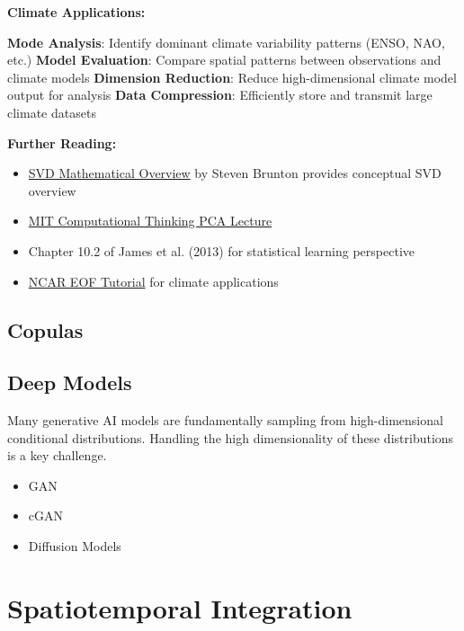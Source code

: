 \documentclass[
  letterpaper,
  DIV=11,
  numbers=noendperiod]{scrreprt}
\providecommand{\tightlist}{%
  \setlength{\itemsep}{0pt}\setlength{\parskip}{0pt}}
\begin{document}
\textbf{Climate Applications:}

\textbf{Mode Analysis}: Identify dominant climate variability patterns
(ENSO, NAO, etc.) \textbf{Model Evaluation}: Compare spatial patterns
between observations and climate models \textbf{Dimension Reduction}:
Reduce high-dimensional climate model output for analysis \textbf{Data
Compression}: Efficiently store and transmit large climate datasets

\textbf{Further Reading:}

\begin{itemize}
\tightlist
\item
  \href{https://youtube.com/watch?v=nbBvuuNVfco&feature=shared}{SVD
  Mathematical Overview} by Steven Brunton provides conceptual SVD
  overview
\item
  \href{https://computationalthinking.mit.edu/Fall23/data_science/pca/}{MIT
  Computational Thinking PCA Lecture}
\item
  Chapter 10.2 of James et al. (2013) for statistical learning
  perspective
\item
  \href{https://climatedataguide.ucar.edu/climate-tools/empirical-orthogonal-function-eof-analysis-and-rotated-eof-analysis}{NCAR
  EOF Tutorial} for climate applications
\end{itemize}

\subsection{Copulas}\label{copulas}

\subsection{Deep Models}\label{deep-models}

Many generative AI models are fundamentally sampling from
high-dimensional conditional distributions. Handling the high
dimensionality of these distributions is a key challenge.

\begin{itemize}
\tightlist
\item
  GAN
\item
  cGAN
\item
  Diffusion Models
\end{itemize}

\section{Spatiotemporal Integration}\label{spatiotemporal-integration}
\end{document}
